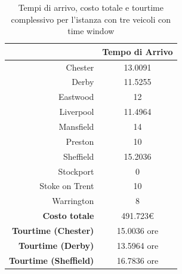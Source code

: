 
		\begin{table}[H]
			\tiny
			\centering
			\begin{tabular}{rc}

				\toprule
				& Tempo di Arrivo \\

				\midrule
				Chester & 13.0091 \\
				Derby & 11.5255 \\
				Eastwood & 12 \\
				Liverpool & 11.4964 \\
				Mansfield & 14 \\
				Preston  & 10 \\
				Sheffield & 15.2036 \\
				Stockport & 0 \\
				Stoke on Trent & 10 \\
				Warrington & 8 \\


				\midrule
				\textbf{Costo totale} & 491.723€ \\
				\textbf{Tourtime (Chester)} & 15.0036 ore \\
				\textbf{Tourtime (Derby)} & 13.5964 ore \\
				\textbf{Tourtime (Sheffield)} & 16.7836 ore \\
				\bottomrule
			\end{tabular}
			\label{table:instance_5_totale}
			\caption{Tempi di arrivo, costo totale e tourtime complessivo per l'istanza con tre veicoli con time window}
		\end{table}
